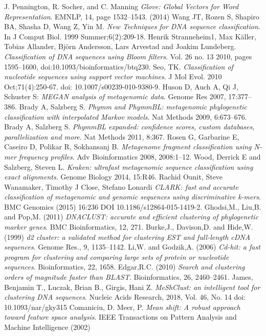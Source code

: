 \documentclass[oneside, twocolumn, a4paper, 10pt]{IEEEtran}
\begin{document}
\begin{thebibliography}{6}
 J. Pennington, R. Socher, and C. Manning \textit{Glove: Global Vectors for Word Representation}. EMNLP, 14, page 1532--1543. (2014)
 Wang JT, Rozen S, Shapiro BA, Shasha D, Wang Z, Yin M. \textit{New Techniques for DNA sequence classification}. In J Comput Biol. 1999 Summer;6(2):209-18.
 Henrik Stranneheim1, Max K\"{a}ller, Tobias Allander, Bj\"{o}rn Andersson, Lars Arvestad and Joakim Lundeberg. \textit{Classification of DNA sequences using Bloom filters}. Vol. 26 no. 13 2010, pages 1595–1600, doi:10.1093/bioinformatics/btq230.
 Seo, TK. \textit{Classification of nucleotide sequences using support vector machines}. J Mol Evol. 2010 Oct;71(4):250-67. doi: 10.1007/s00239-010-9380-9.
 Huson D, Auch A, Qi J, Schuster S: \textit{MEGAN analysis of metagenomic data}. Genome Res 2007, 17:377–386.
 Brady A, Salzberg S. \textit{Phymm and PhymmBL: metagenomic phylogenetic classification with interpolated Markov models}. Nat Methods 2009, 6:673–676.
 Brady A, Salzberg S. \textit{PhymmBL expanded: confidence scores, custom databases, parallelization and more}. Nat Methods 2011, 8:367.
 Rosen G, Garbarine E, Caseiro D, Polikar R, Sokhansanj B. \textit{Metagenome fragment classification using N-mer frequency profiles}. Adv Bioinformatics 2008, 2008:1–12.
 Wood, Derrick E and Salzberg, Steven L. \textit{Kraken: ultrafast metagenomic sequence classification using exact alignments}. Genome Biology 2014, 15:R46.
 Rachid Ounit, Steve Wanamaker, Timothy J Close, Stefano Lonardi \textit{CLARK: fast and accurate classification of metagenomic and genomic sequences using discriminative k-mers}. BMC Genomics (2015) 16:236 DOI 10.1186/s12864-015-1419-2.
 Ghodsi,M., Liu,B. and Pop,M. (2011) \textit{DNACLUST: accurate and efficient clustering of phylogenetic marker genes}. BMC Bioinformatics, 12, 271.
 Burke,J., Davison,D. and Hide,W. (1999) \textit{d2 cluster: a validated method for clustering EST and full-length cDNA sequences}. Genome Res., 9, 1135–1142.
 Li,W. and Godzik,A. (2006) \textit{Cd-hit: a fast program for clustering and comparing large sets of protein or nucleotide sequences}. Bioinformatics, 22, 1658.
 Edgar,R.C. (2010) \textit{Search and clustering orders of magnitude faster than BLAST}. Bioinformatics, 26, 2460–2461.
 James, Benjamin T., Luczak, Brian B., Girgis, Hani Z. \textit{MeShClust: an intelligent tool for clustering DNA sequences}. Nucleic Acids Research, 2018, Vol. 46, No. 14 doi: 10.1093/nar/gky315
 Comaniciu, D. Meer, P. \textit{Mean shift: A robust approach toward feature space analysis}. IEEE Transactions on Pattern Analysis and Machine Intelligence (2002)
\end{thebibliography}
\end{document}
